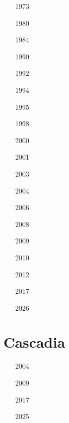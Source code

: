\begin{small}
\begin{itemize}
\item[1973] 
\item[1980] 
\item[1984] 
\item[1990] 
\item[1992] 
\item[1994] 
\item[1995] 
\item[1998] 
\item[2000] 
\item[2001] 
\item[2003]  \\ 
\item[2004] 
\item[2006]  \\ 
\item[2008]  \\ 
\item[2009]  \\ 
\item[2010] 
\item[2012] 
\item[2017] 
\item[2026] 
\end{itemize}
\end{small}



\section{Cascadia}

\begin{small}
\begin{itemize}
\item[2004] 
\item[2009] 
\item[2017] 
\item[2025] 
\end{itemize}
\end{small}

